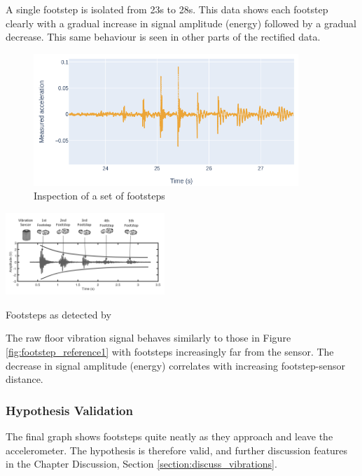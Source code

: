 A single footstep is isolated from 23s to 28s. This data shows each footstep clearly with a gradual increase in signal amplitude (energy) followed by a gradual decrease. This same behaviour is seen in other parts of the rectified data. 



\begin{figure}[!h]
    \raggedright
    \includegraphics[width=10cm]{images/stage_graphs/vibration_results/footsteps_sequence.png}
    \caption{Inspection of a set of footsteps}
\end{figure}

\begin{marginfigure}%
    \raggedright \vspace{1cm}
    \includegraphics[width=6cm]{images/stage_graphs/vibration_results/reference_footsteps_bw.png}
    \caption{Footsteps as detected by \cite{gait_analysis}}
    \label{fig:footstep_reference1}
\end{marginfigure}  

The raw floor vibration signal behaves similarly to those in Figure \ref{fig:footstep_reference1} with footsteps increasingly far from the sensor. The decrease in signal amplitude (energy) correlates with increasing footstep-sensor distance.

\subsubsection{Hypothesis Validation}
The final graph shows footsteps quite neatly as they approach and leave the accelerometer. The hypothesis is therefore valid, and further discussion features in the Chapter Discussion, Section \ref{section:discuss_vibrations}.


